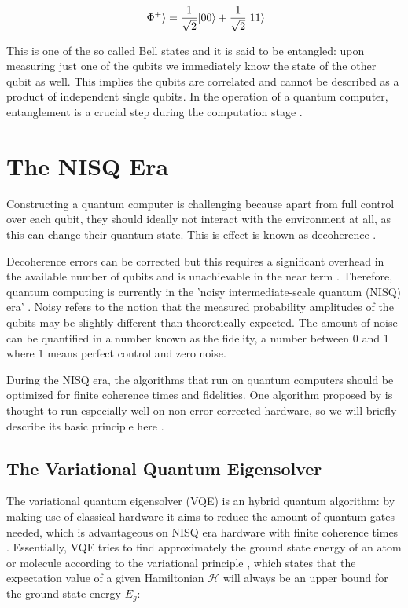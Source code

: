 \begin{equation}\label{eq:Entangled}
	\lvert\Phi^+\rangle = \frac{1}{\sqrt{2}} \lvert00\rangle+ \frac{1}{\sqrt{2}} \lvert11\rangle
\end{equation}

This is one of the so called Bell states \cite{Nielsen2011} and it is said to be entangled: upon measuring just one of the qubits we immediately know the state of the other qubit as well. This implies the qubits are correlated and cannot be described as a product of independent single qubits. In the operation of a quantum computer, entanglement is a crucial step during the computation stage \cite{Henriet2020}. 

\section{The NISQ Era}

Constructing a quantum computer is challenging because apart from full control over each qubit, they should ideally not interact with the environment at all, as this can change their quantum state. This is effect is known as decoherence \cite{DiVincenzo2000}.

Decoherence errors can be corrected but this requires a significant overhead in the available number of qubits and is unachievable in the near term \cite{Peres1985,Ladd2010}. Therefore, quantum computing is currently in the 'noisy intermediate-scale quantum (NISQ) era' \cite{Preskill2018}. Noisy refers to the notion that the measured probability amplitudes of the qubits may be slightly different than theoretically expected. The amount of noise can be quantified in a number known as the fidelity, a number between 0 and 1 where 1 means perfect control and zero noise. 

During the NISQ era, the algorithms that run on quantum computers should be optimized for finite coherence times and fidelities. One algorithm proposed by \cite{Peruzzo2014} is thought to run especially well on non error-corrected hardware, so we will briefly describe its basic principle here \cite{McClean2016}. 

\subsection{The Variational Quantum Eigensolver}

The variational quantum eigensolver (VQE) is an hybrid quantum algorithm: by making use of classical hardware it aims to reduce the amount of quantum gates needed, which is advantageous on NISQ era hardware with finite coherence times \cite{McClean2016}. Essentially, VQE tries to find approximately the ground state energy of an atom or molecule according to the variational principle \cite{Griffiths2004}, which states that the expectation value of a given Hamiltonian $\mathcal{H}$ will always be an upper bound for the ground state energy $E_g$:

